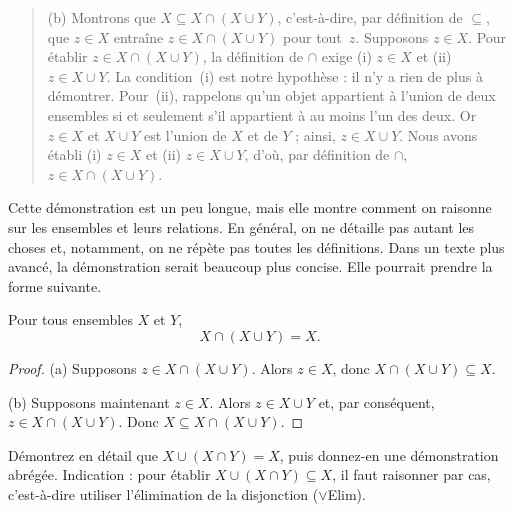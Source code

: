 \documentclass[../../../include/open-logic-section]{subfiles}
\begin{document}
\begin{explain}
\begin{quote}
(b) Montrons que $X\subseteq X\cap(X\cup Y)$, c'est-à-dire, par
définition de $\subseteq$, que $z\in X$ entraîne
$z\in X\cap(X\cup Y)$ pour tout~$z$. Supposons $z\in X$. Pour
établir $z\in X\cap(X\cup Y)$, la définition de $\cap$ exige
(i) $z\in X$ et (ii) $z\in X\cup Y$. La condition~(i) est notre
hypothèse : il n'y a rien de plus à démontrer. Pour~(ii), rappelons
qu'un objet appartient à l'union de deux ensembles si et seulement
s'il appartient à au moins l'un des deux. Or $z\in X$ et
$X\cup Y$ est l'union de $X$ et de $Y$ ; ainsi, $z\in X\cup Y$.
Nous avons établi (i) $z\in X$ et (ii) $z\in X\cup Y$, d'où,
par définition de $\cap$, $z\in X\cap(X\cup Y)$.
\end{quote}

Cette démonstration est un peu longue, mais elle montre comment on
raisonne sur les ensembles et leurs relations. En général, on ne
détaille pas autant les choses et, notamment, on ne répète pas toutes
les définitions. Dans un texte plus avancé, la démonstration serait
beaucoup plus concise. Elle pourrait prendre la forme suivante.
\end{explain}

\begin{prop}[Absorption]
Pour tous ensembles $X$ et $Y$,
\[
X\cap(X\cup Y)=X.
\]
\end{prop}

\begin{proof}
(a) Supposons $z\in X\cap(X\cup Y)$. Alors $z\in X$, donc
$X\cap(X\cup Y)\subseteq X$.

(b) Supposons maintenant $z\in X$. Alors $z\in X\cup Y$ et, par
conséquent, $z\in X\cap(X\cup Y)$. Donc
$X\subseteq X\cap(X\cup Y)$.
\end{proof}

\begin{prob}
Démontrez en détail que $X\cup(X\cap Y)=X$, puis donnez-en une
démonstration abrégée. Indication : pour établir
$X\cup(X\cap Y)\subseteq X$, il faut raisonner par cas, c'est-à-dire
utiliser l'élimination de la disjonction ($\lor$Elim).
\end{prob}
\end{document}
